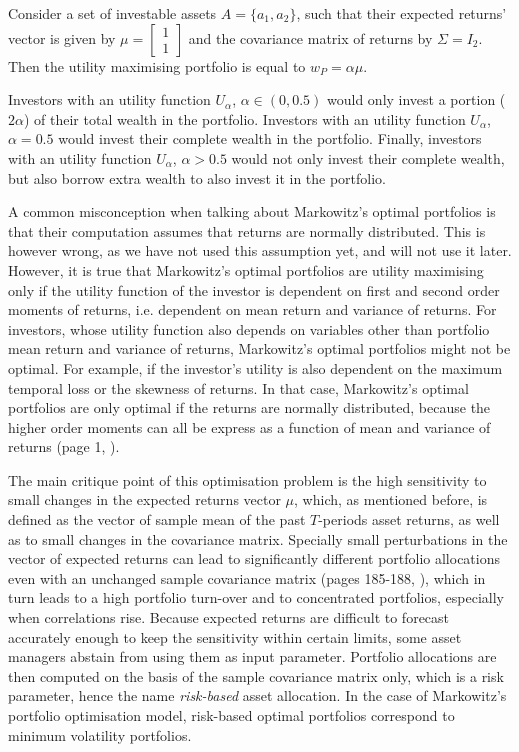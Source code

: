    \begin{example}
        Consider a set of investable assets $A = \{ a_1, a_2 \}$, such that their expected returns' vector is given by $\mu = \begin{bmatrix} 1 \\ 1 \end{bmatrix}$ and the covariance matrix of returns by $\Sigma = I_2$. Then the utility maximising portfolio is equal to $w_P = \alpha \mu$.
        
        Investors with an utility function $U_{\alpha}$, $\alpha \in (0, 0.5)$ would only invest a portion ($2 \alpha$) of their total wealth in the portfolio. Investors with an utility function $U_{\alpha}$, $\alpha = 0.5$ would invest their complete wealth in the portfolio. Finally, investors with an utility function $U_{\alpha}$, $\alpha > 0.5$ would not only invest their complete wealth, but also borrow extra wealth to also invest it in the portfolio.
    \end{example}
    
    A common misconception when talking about Markowitz's optimal portfolios is that their computation assumes that returns are normally distributed. This is however wrong, as we have not used this assumption yet, and will not use it later. However, it is true that Markowitz's optimal portfolios are utility maximising only if the utility function of the investor is dependent on first and second order moments of returns, i.e. dependent on mean return and variance of returns. For investors, whose utility function also depends on variables other than portfolio mean return and variance of returns, Markowitz's optimal portfolios might not be optimal. For example, if the investor's utility is also dependent on the maximum temporal loss or the skewness of returns. In that case, Markowitz's optimal portfolios are only optimal if the returns are normally distributed, because the higher order moments can all be express as a function of mean and variance of returns (page 1, \cite{berndscherer}).
    
    The main critique point of this optimisation problem is the high sensitivity to small changes in the expected returns vector $\mu$, which, as mentioned before, is defined as the vector of sample mean of the past $T$-periods asset returns, as well as to small changes in the covariance matrix. Specially small perturbations in the vector of expected returns can lead to significantly different portfolio allocations even with an unchanged sample covariance matrix (pages 185-188, \cite{berndscherer}), which in turn leads to a high portfolio turn-over and to concentrated portfolios, especially when correlations rise. Because expected returns are difficult to forecast accurately enough to keep the sensitivity within certain limits, some asset managers abstain from using them as input parameter. Portfolio allocations are then computed on the basis of the sample covariance matrix only, which is a risk parameter, hence the name \textit{risk-based} asset allocation. In the case of Markowitz's portfolio optimisation model, risk-based optimal portfolios correspond to minimum volatility portfolios.
    
